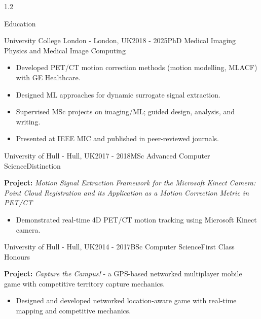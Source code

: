 \documentclass{cv}
\begin{document}
\begin{spacing}{1.2}
\begin{rSection}{Education}
\begin{rSubsection}{University College London \textnormal{- London, UK}}{2018 - 2025}{PhD Medical Imaging Physics and Medical Image Computing}{}
                \item \begin{itemize}
                    \item Developed PET/CT motion correction methods (motion modelling, MLACF) with GE Healthcare.
                    \item Designed ML approaches for dynamic surrogate signal extraction.
                    \item Supervised MSc projects on imaging/ML; guided design, analysis, and writing.
                    \item Presented at IEEE MIC and published in peer-reviewed journals.
                \end{itemize}
            \end{rSubsection}
            
            \item \begin{rSubsection}{University of Hull \textnormal{- Hull, UK}}{2017 - 2018}{MSc Advanced Computer Science}{Distinction}
                \item \textbf{Project:} \textit{Motion Signal Extraction Framework for the Microsoft Kinect Camera: Point Cloud Registration and its Application as a Motion Correction Metric in PET/CT}
                
                \item \begin{itemize}
                    \item Demonstrated real-time 4D PET/CT motion tracking using Microsoft Kinect camera.
                \end{itemize}
            \end{rSubsection}
            
            \item \begin{rSubsection}{University of Hull \textnormal{- Hull, UK}}{2014 - 2017}{BSc Computer Science}{First Class Honours}
                \item \textbf{Project:} \textit{Capture the Campus!} - a GPS-based networked multiplayer mobile game with competitive territory capture mechanics.
                
                \item \begin{itemize}
                    \item Designed and developed networked location-aware game with real-time mapping and competitive mechanics.
                \end{itemize}
            \end{rSubsection}
        \end{rSection}
        

\end{spacing}
\end{document}
